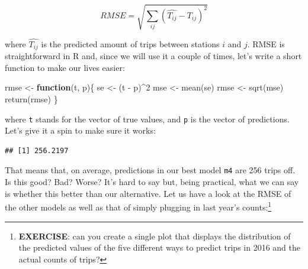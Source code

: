 \documentclass[
]{book}
\newenvironment{Shaded}{\begin{snugshade}}{\end{snugshade}}
\newcommand{\ControlFlowTok}[1]{\textcolor[rgb]{0.13,0.29,0.53}{\textbf{#1}}}
\newcommand{\DecValTok}[1]{\textcolor[rgb]{0.00,0.00,0.81}{#1}}
\newcommand{\FunctionTok}[1]{\textcolor[rgb]{0.00,0.00,0.00}{#1}}
\newcommand{\NormalTok}[1]{#1}
\newcommand{\OtherTok}[1]{\textcolor[rgb]{0.56,0.35,0.01}{#1}}
\newcommand{\SpecialCharTok}[1]{\textcolor[rgb]{0.00,0.00,0.00}{#1}}
\begin{document}
\[
RMSE = \sqrt{ \sum_{ij} (\hat{T_{ij}} - T_{ij})^2}
\]

where \(\hat{T_{ij}}\) is the predicted amount of trips between stations \(i\) and \(j\). RMSE is straightforward in R and, since we will use it a couple of times, let's write a short function to make our lives easier:

\begin{Shaded}
\begin{Highlighting}[]
\NormalTok{rmse }\OtherTok{\textless{}{-}} \ControlFlowTok{function}\NormalTok{(t, p)\{}
\NormalTok{  se }\OtherTok{\textless{}{-}}\NormalTok{ (t }\SpecialCharTok{{-}}\NormalTok{ p)}\SpecialCharTok{\^{}}\DecValTok{2}
\NormalTok{  mse }\OtherTok{\textless{}{-}} \FunctionTok{mean}\NormalTok{(se)}
\NormalTok{  rmse }\OtherTok{\textless{}{-}} \FunctionTok{sqrt}\NormalTok{(mse)}
  \FunctionTok{return}\NormalTok{(rmse)}
\NormalTok{\}}
\end{Highlighting}
\end{Shaded}

where \texttt{t} stands for the vector of true values, and \texttt{p} is the vector of predictions. Let's give it a spin to make sure it works:

\begin{Shaded}
\end{Shaded}

\begin{verbatim}
## [1] 256.2197
\end{verbatim}

That means that, on average, predictions in our best model \texttt{m4} are 256 trips off. Is this good? Bad? Worse? It's hard to say but, being practical, what we can say is whether this better than our alternative. Let us have a look at the RMSE of the other models as well as that of simply plugging in last year's counts:\footnote{\textbf{EXERCISE}: can you create a single plot that displays the distribution of the predicted values of the five different ways to predict trips in 2016 and the actual counts of trips?}
\end{document}
